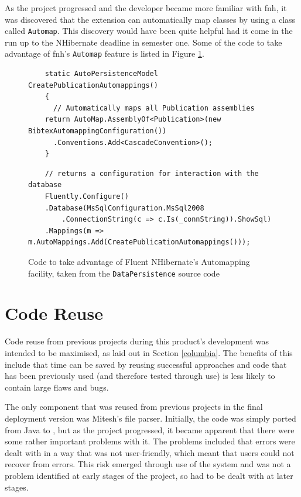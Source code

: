 As the project progressed and the developer became more familiar with \gls{fnh}, it was discovered that the extension can automatically map classes by using a class called \texttt{Automap}.  This discovery would have been quite helpful had it come in the run up to the NHibernate deadline in semester one.
Some of the code to take advantage of \gls{fnh}'s \texttt{Automap} feature is listed in Figure \ref{fig:fnhCode}.

\begin{figure}
	\begin{center}
			\lstset{language=CSharp} 
			\begin{lstlisting}
	static AutoPersistenceModel CreatePublicationAutomappings()
	{
	  // Automatically maps all Publication assemblies
    return AutoMap.AssemblyOf<Publication>(new BibtexAutomappingConfiguration())
      .Conventions.Add<CascadeConvention>();
	}
			\end{lstlisting}
			\lstset{language=CSharp} 
			\begin{lstlisting}
	// returns a configuration for interaction with the database
	Fluently.Configure()
    .Database(MsSqlConfiguration.MsSql2008
		.ConnectionString(c => c.Is(_connString)).ShowSql)
    .Mappings(m => m.AutoMappings.Add(CreatePublicationAutomappings()));
			\end{lstlisting}
		\caption{Code to take advantage of Fluent NHibernate's Automapping facility, taken from the \texttt{DataPersistence} source code}
		\label{fig:fnhCode}
	\end{center}
\end{figure}

\section{Code Reuse}
\label{codeReuse}
Code reuse from previous projects during this product's development was intended to be maximised, as laid out in Section \ref{columbia}.  The benefits of this include that time can be saved by reusing successful approaches and code that has been previously used (and therefore tested through use) is less likely to contain large flaws and bugs.

The only component that was reused from previous projects in the final deployment version was Mitesh's \bibtex{} file parser.  Initially, the code was simply ported from Java to \cs, but as the project progressed, it became apparent that there were some rather important problems with it.  The problems included that errors were dealt with in a way that was not user-friendly, which meant that users could not recover from errors.  This risk emerged through use of the system and was not a problem identified at early stages of the project, so had to be dealt with at later stages.

